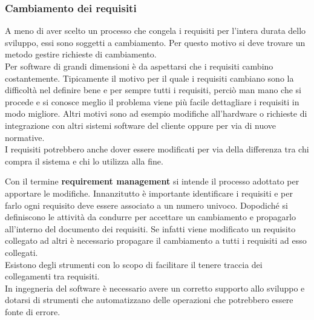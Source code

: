 \subsubsection{Cambiamento dei requisiti}
A meno di aver scelto un processo che congela i requisiti per l'intera durata dello sviluppo, essi sono soggetti a cambiamento.
Per questo motivo si deve trovare un metodo gestire richieste di cambiamento.\\
Per software di grandi dimensioni è da aspettarsi che i requisiti cambino costantemente.
Tipicamente il motivo per il quale i requisiti cambiano sono la difficoltà nel definire bene e per sempre tutti i requisiti, perciò man mano che si procede e si conosce meglio il problema viene più facile dettagliare i requisiti in modo migliore.
Altri motivi sono ad esempio modifiche all'hardware o richieste di integrazione con altri sistemi software del cliente oppure per via di nuove normative.\\
I requisiti potrebbero anche dover essere modificati per via della differenza tra chi compra il sistema e chi lo utilizza alla fine.

Con il termine \textbf{requirement management} si intende il processo adottato per apportare le modifiche.
Innanzitutto è importante identificare i requisiti e per farlo ogni requisito deve essere associato a un numero univoco.
Dopodiché si definiscono le attività da condurre per accettare un cambiamento e propagarlo all'interno del documento dei requisiti.
Se infatti viene modificato un requisito collegato ad altri è necessario propagare il cambiamento a tutti i requisiti ad esso collegati.\\
Esistono degli strumenti con lo scopo di facilitare il tenere traccia dei collegamenti tra requisiti.\\
In ingegneria del software è necessario avere un corretto supporto allo sviluppo e dotarsi di strumenti che automatizzano delle operazioni che potrebbero essere fonte di errore.